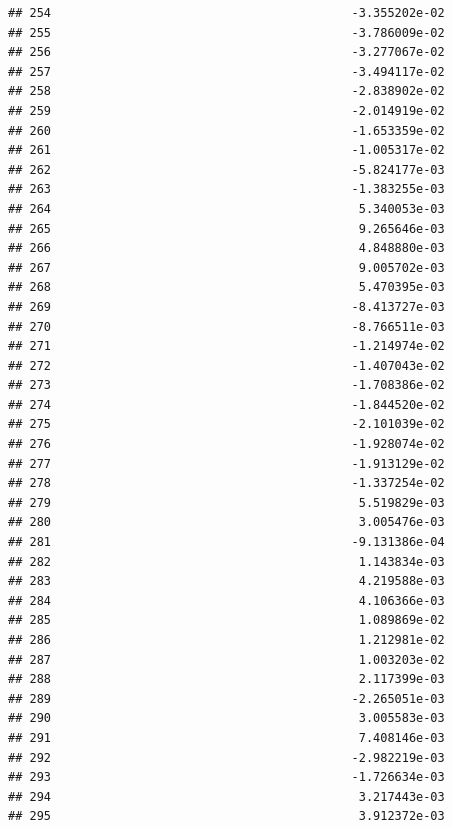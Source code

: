 \documentclass[
]{article}
\begin{document}
\begin{verbatim}
## 254                                          -3.355202e-02
## 255                                          -3.786009e-02
## 256                                          -3.277067e-02
## 257                                          -3.494117e-02
## 258                                          -2.838902e-02
## 259                                          -2.014919e-02
## 260                                          -1.653359e-02
## 261                                          -1.005317e-02
## 262                                          -5.824177e-03
## 263                                          -1.383255e-03
## 264                                           5.340053e-03
## 265                                           9.265646e-03
## 266                                           4.848880e-03
## 267                                           9.005702e-03
## 268                                           5.470395e-03
## 269                                          -8.413727e-03
## 270                                          -8.766511e-03
## 271                                          -1.214974e-02
## 272                                          -1.407043e-02
## 273                                          -1.708386e-02
## 274                                          -1.844520e-02
## 275                                          -2.101039e-02
## 276                                          -1.928074e-02
## 277                                          -1.913129e-02
## 278                                          -1.337254e-02
## 279                                           5.519829e-03
## 280                                           3.005476e-03
## 281                                          -9.131386e-04
## 282                                           1.143834e-03
## 283                                           4.219588e-03
## 284                                           4.106366e-03
## 285                                           1.089869e-02
## 286                                           1.212981e-02
## 287                                           1.003203e-02
## 288                                           2.117399e-03
## 289                                          -2.265051e-03
## 290                                           3.005583e-03
## 291                                           7.408146e-03
## 292                                          -2.982219e-03
## 293                                          -1.726634e-03
## 294                                           3.217443e-03
## 295                                           3.912372e-03

\end{verbatim}
\end{document}

